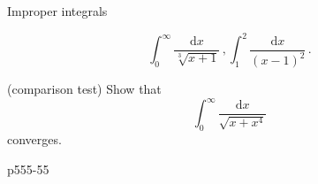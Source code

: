\begin{frame}{Improper integrals}

\begin{example}
\[
\int_{0}^{\infty}\frac{\mathrm{d}x}{\sqrt[3]{x+1}}\,,\int_{1}^{2}\frac{\mathrm{d}x}{\left(x-1\right)^{2}}\,.
\]

\end{example}

\begin{example}
(comparison test) Show that
\[
\int_{0}^{\infty}\frac{\mathrm{d}x}{\sqrt{x+x^{4}}}
\]
converges.
\end{example}



\begin{example}
p555-55
\end{example}

\end{frame}



